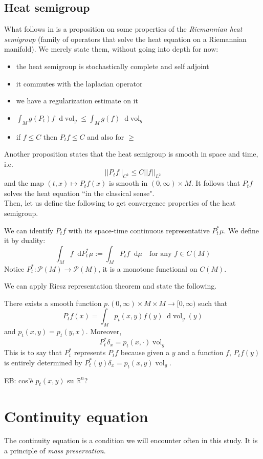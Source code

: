 \documentclass[a4paper,12pt,reqno]{amsbook}
\theoremstyle{definition} %
\newcommand*\de{\mathop{}\!\mathrm{d}}
\newcommand{\1}{\mathbbm{1}}
\newcommand{\mP}{\mathscr{P}}
\DeclareMathOperator{\vol}{vol}
\def\vol{\mathop{\mathrm{vol}}\nolimits}
\theoremstyle{plain}
\theoremstyle{remark}
\begin{document}
{\subsection{Heat semigroup} What follows in \cite{brue} is a proposition on some properties of the \textit{Riemannian heat semigroup} (family of operators that solve the heat equation on a Riemannian manifold). We merely state them, without going into depth for now:
\begin{itemize}
    \item the heat semigroup is stochastically complete and self adjoint
    \item it commutes with the laplacian operator
    \item we have a regularization estimate on it
    \item $\int_M g(P_t)f \de{\vol_g} \le \int_M g(f) \de{\vol_g}$
    \item if $f\le C$ then $P_tf\le C$ and also for $\ge$
\end{itemize}
Another proposition states that the heat semigroup is smooth in space and time, i.e.
\[
||P_tf||_{C^k} \le C ||f||_{L^2}
\]
 and the map $(t,x) \mapsto P_tf(x)$ is smooth in $(0,\infty) \times M$. It follows that $P_tf$ solves the heat equation ``in the classical sense".
\\

 Then, let us define the following to get convergence properties of the heat semigroup. 

 We can identify $P_tf$ with its space-time continuous representative $P_t^*\mu$. We define it by duality:
 \[
 \int_M f \de{P_t^*\mu} := \int_M P_tf \de{\mu} \quad \text{for any }f\in C(M)
 \]
Notice $P_t^*:\mP(M) \to \mP(M)$, it is a monotone functional on $C(M)$. 

We can apply Riesz representation theorem and state the following.
\begin{proposition}
There exists a smooth function $p.(0,\infty) \times M \times M \to [0,\infty)$ such that
\[
P_tf(x) = \int_M p_t(x,y) f(y) \de{\vol_g(y)}
\]
and $p_t(x,y)=p_t(y,x)$. Moreover, 
\[
P_t^*\delta_x=p_t(x,\cdot)\vol_g
\]
This is to say that $P_t^*$ represents $P_tf$ because given a $y$ and a function $f$, $P_tf(y)$ is entirely determined by $P_t^*(y)\delta_x = p_t(x,y)\vol_g$.
\end{proposition}


{\color{blue}EB: cos'è $p_t(x,y)$ su $\mathbb R^n$?}

\section{Continuity equation}
The continuity equation is a condition we will encounter often in this study. It is a principle of \textit{mass preservation}.

}
\end{document}
